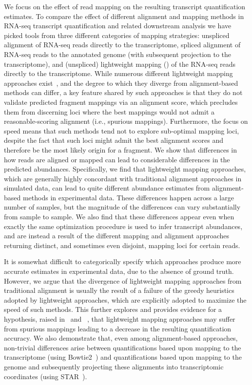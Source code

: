 We focus on the effect of read
mapping on the resulting transcript quantification estimates. To compare the
effect of different alignment and mapping methods in RNA-seq transcript
quantification and related downstream analysis we have picked tools from three
different categories of mapping strategies: unspliced alignment of RNA-seq reads
directly to the transcriptome, spliced alignment of RNA-seq reads to the
annotated genome (with subsequent projection to the transcriptome), and
(unspliced) lightweight mapping (\qm) of the RNA-seq reads directly to the
transcriptome. While numerous different lightweight mapping approaches
exist~\citep{sailfish,rnaskim,kallisto,rapmap,fleximer}, and the degree to
which they diverge from alignment-based methods can differ, a key feature
shared by such approaches is that they do not validate predicted fragment mappings
via an alignment score, which precludes them from discerning loci where the best mappings 
would not admit a reasonable-scoring alignment (i.e., spurious mappings). Furthermore, 
the focus on speed means that such methods tend not to explore sub-optimal mapping loci, 
despite the fact that such loci might admit the best alignment scores and therefore be 
the most likely origin for a fragment. We show that differences in how reads are aligned 
or mapped can lead to considerable differences in the predicted abundances. Specifically, we
find that lightweight mapping approaches, which are generally highly
concordant with traditional alignment approaches in simulated data, can lead to
quite different abundance estimates from alignment-based methods in experimental
data. These differences happen across a large number
of samples, but the magnitude of the differences can vary substantially from sample to sample. We
also find that these differences appear even when exactly the same optimization procedure
is used to infer transcript abundances, and are instead a result of the different
mapping and alignment approaches returning distinct, and sometimes even
disjoint, mapping loci for certain reads.

It is somewhat difficult to categorically specify which approaches produce more accurate 
estimates in experimental data, due to the absence of ground truth. However,
we argue that the divergence of lightweight mapping approaches from traditional
alignment is usually the result of a failure of the greedy heuristics adopted by
lightweight approaches, which are explicitly adopted to maximize the speed of
such methods. This further explores and provides evidence for a hypothesis, raised
in~\citet{selaln} and ~\citet{heraem}, that lightweight mapping approaches may suffer from
spurious mappings leading to a decrease in the resulting quantification
accuracy. We also demonstrate that, even among alignment-based approaches,
non-trivial differences arise between quantifications based upon mapping to the
transcriptome (using Bowtie2~\citep{bowtie2}) and quantifications based upon
mapping to the genome and subsequently projecting these alignments into
transcriptomic coordinates (using STAR~\citep{star}).

